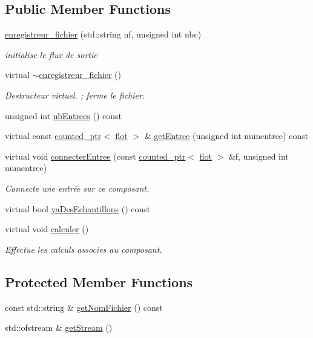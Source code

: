 \subsection*{Public Member Functions}
\begin{DoxyCompactItemize}
\item 
\hyperlink{classenregistreur__fichier_ab8eb72e794d29c47dc3476259de2836c}{enregistreur\-\_\-fichier} (std\-::string nf, unsigned int nbc)
\begin{DoxyCompactList}\small\item\em initialise le flux de sortie \end{DoxyCompactList}\item 
virtual \hyperlink{classenregistreur__fichier_a34d78a6c1510f953ca2d66a2767e2dfd}{$\sim$enregistreur\-\_\-fichier} ()
\begin{DoxyCompactList}\small\item\em Destructeur virtuel. ; ferme le fichier. \end{DoxyCompactList}\item 
unsigned int \hyperlink{classenregistreur__fichier_a46b864aea1016ecef695e085870706af}{nb\-Entrees} () const 
\item 
virtual const \hyperlink{classcounted__ptr}{counted\-\_\-ptr}$<$ \hyperlink{classflot}{flot} $>$ \& \hyperlink{classenregistreur__fichier_a45c98f8a93f4f6b5ac733248769aebb5}{get\-Entree} (unsigned int numentree) const 
\item 
virtual void \hyperlink{classenregistreur__fichier_a3d8584ab625fab747cf8c01cc410362a}{connecter\-Entree} (const \hyperlink{classcounted__ptr}{counted\-\_\-ptr}$<$ \hyperlink{classflot}{flot} $>$ \&f, unsigned int numentree)
\begin{DoxyCompactList}\small\item\em Connecte une entrée sur ce composant. \end{DoxyCompactList}\item 
virtual bool \hyperlink{classenregistreur__fichier_a1f20e9ef18665e9b3714d067b573a9de}{ya\-Des\-Echantillons} () const 
\item 
virtual void \hyperlink{classenregistreur__fichier_a3f123c156b96a9eec82bdec24962d597}{calculer} ()
\begin{DoxyCompactList}\small\item\em Effectue les calculs associes au composant. \end{DoxyCompactList}\end{DoxyCompactItemize}
\subsection*{Protected Member Functions}
\begin{DoxyCompactItemize}
\item 
const std\-::string \& \hyperlink{classenregistreur__fichier_a86ad2c3ffecb4f12f057e0d63e7bbb7f}{get\-Nom\-Fichier} () const 
\item 
std\-::ofstream \& \hyperlink{classenregistreur__fichier_a7781a7305c09f3777cbf96a0d06ddfb4}{get\-Stream} ()
\end{DoxyCompactItemize}
